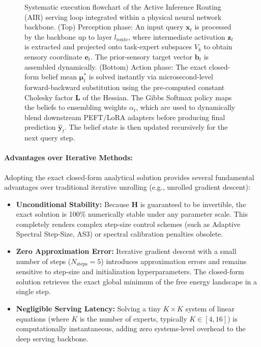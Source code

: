 \begin{figure}[t]
\caption{Systematic execution flowchart of the Active Inference Routing (AIR) serving loop integrated within a physical neural network backbone. (Top) Perception phase: An input query $\mathbf{x}_t$ is processed by the backbone up to layer $l_{\text{route}}$, where intermediate activation $\mathbf{z}_t$ is extracted and projected onto task-expert subspaces $V_k$ to obtain sensory coordinate $\mathbf{e}_t$. The prior-sensory target vector $\mathbf{b}_t$ is assembled dynamically. (Bottom) Action phase: The exact closed-form belief mean $\mathbf{\mu}_t^*$ is solved instantly via microsecond-level forward-backward substitution using the pre-computed constant Cholesky factor $\mathbf{L}$ of the Hessian. The Gibbs Softmax policy maps the beliefs to ensembling weights $\alpha_t$, which are used to dynamically blend downstream PEFT/LoRA adapters before producing final prediction $\hat{\mathbf{y}}_t$. The belief state is then updated recursively for the next query step.}
\label{fig:systems_flowchart}
\end{figure}

\paragraph{Advantages over Iterative Methods:}
Adopting the exact closed-form analytical solution provides several fundamental advantages over traditional iterative unrolling (e.g., unrolled gradient descent):
\begin{itemize}
    \item \textbf{Unconditional Stability:} Because $\mathbf{H}$ is guaranteed to be invertible, the exact solution is 100\% numerically stable under any parameter scale. This completely renders complex step-size control schemes (such as Adaptive Spectral Step-Size, AS3) or spectral calibration penalties obsolete.
    \item \textbf{Zero Approximation Error:} Iterative gradient descent with a small number of steps ($N_{\text{steps}}=5$) introduces approximation errors and remains sensitive to step-size and initialization hyperparameters. The closed-form solution retrieves the exact global minimum of the free energy landscape in a single step.
    \item \textbf{Negligible Serving Latency:} Solving a tiny $K \times K$ system of linear equations (where $K$ is the number of experts, typically $K \in [4, 16]$) is computationally instantaneous, adding zero systems-level overhead to the deep serving backbone.
\end{itemize}

